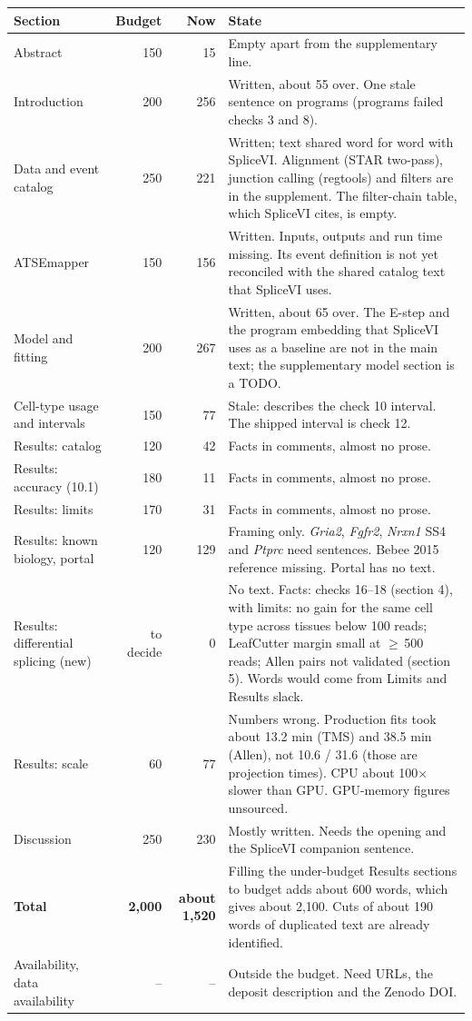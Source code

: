 \documentclass[10pt]{article}
\newcommand{\gee}{$\geq$\,}
\begin{document}
\footnotesize
\begin{longtable}{L{36mm}rrL{98mm}}
\toprule
Section & Budget & Now & State \\
\midrule
Abstract & 150 & 15 & Empty apart from the supplementary line. \\
Introduction & 200 & 256 & Written, about 55 over. One stale sentence on programs (programs failed checks 3 and 8). \\
Data and event catalog & 250 & 221 & Written; text shared word for word with SpliceVI. Alignment (STAR two-pass), junction calling (regtools) and filters are in the supplement. The filter-chain table, which SpliceVI cites, is empty. \\
ATSEmapper & 150 & 156 & Written. Inputs, outputs and run time missing. Its event definition is not yet reconciled with the shared catalog text that SpliceVI uses. \\
Model and fitting & 200 & 267 & Written, about 65 over. The E-step and the program embedding that SpliceVI uses as a baseline are not in the main text; the supplementary model section is a TODO. \\
Cell-type usage and intervals & 150 & 77 & Stale: describes the check 10 interval. The shipped interval is check 12. \\
Results: catalog & 120 & 42 & Facts in comments, almost no prose. \\
Results: accuracy (10.1) & 180 & 11 & Facts in comments, almost no prose. \\
Results: limits & 170 & 31 & Facts in comments, almost no prose. \\
Results: known biology, portal & 120 & 129 & Framing only. \textit{Gria2}, \textit{Fgfr2}, \textit{Nrxn1} SS4 and \textit{Ptprc} need sentences. Bebee 2015 reference missing. Portal has no text. \\
Results: differential splicing (new) & to decide & 0 & No text. Facts: checks 16--18 (section 4), with limits: no gain for the same cell type across tissues below 100 reads; LeafCutter margin small at \gee500 reads; Allen pairs not validated (section 5). Words would come from Limits and Results slack. \\
Results: scale & 60 & 77 & Numbers wrong. Production fits took about 13.2 min (TMS) and 38.5 min (Allen), not 10.6 / 31.6 (those are projection times). CPU about 100$\times$ slower than GPU. GPU-memory figures unsourced. \\
Discussion & 250 & 230 & Mostly written. Needs the opening and the SpliceVI companion sentence. \\
\midrule
\textbf{Total} & \textbf{2,000} & \textbf{about 1,520} & Filling the under-budget Results sections to budget adds about 600 words, which gives about 2,100. Cuts of about 190 words of duplicated text are already identified. \\
\midrule
Availability, data availability & -- & -- & Outside the budget. Need URLs, the deposit description and the Zenodo DOI. \\
\bottomrule
\end{longtable}
\normalsize
\end{document}
